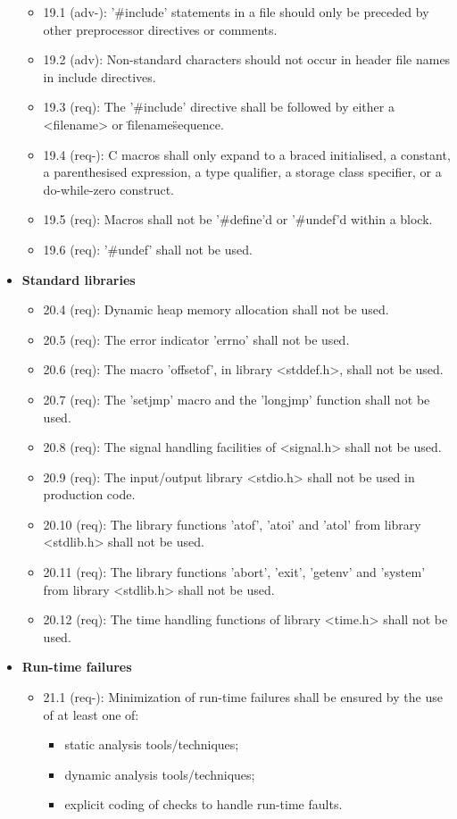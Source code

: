 \begin{itemize}
\begin{itemize}
\item 19.1 (adv-): '\#include' statements in a file should only be preceded by other preprocessor directives or comments.
\item 19.2 (adv): Non-standard characters should not occur in header file names in include directives.
\item 19.3 (req): The '\#include' directive shall be followed by either a <filename> or \"filename\" sequence.
\item 19.4 (req-): C macros shall only expand to a braced initialised, a constant, a parenthesised expression, a type qualifier, a storage class specifier, or a do-while-zero construct.
\item 19.5 (req): Macros shall not be '\#define'd or '\#undef'd within a block.
\item 19.6 (req): '\#undef' shall not be used.
\end{itemize}
\item \textbf{Standard libraries}
\begin{itemize}
\item 20.4 (req): Dynamic heap memory allocation shall not be used.
\item 20.5 (req): The error indicator 'errno' shall not be used.
\item 20.6 (req): The macro 'offsetof', in library <stddef.h>, shall not be used.
\item 20.7 (req): The 'setjmp' macro and the 'longjmp' function shall not be used.
\item 20.8 (req): The signal handling facilities of <signal.h> shall not be used.
\item 20.9 (req): The input/output library <stdio.h> shall not be used in production code.
\item 20.10 (req): The library functions 'atof', 'atoi' and 'atol' from library <stdlib.h> shall not be used.
\item 20.11 (req): The library functions 'abort', 'exit', 'getenv' and 'system' from library <stdlib.h> shall not be used.
\item 20.12 (req): The time handling functions of library <time.h> shall not be used.
\end{itemize}
\item \textbf{Run-time failures}
\begin{itemize}
\item 21.1 (req-): Minimization of run-time failures shall be ensured by the use of at least one of: 
\begin{itemize}
\item static analysis tools/techniques;
\item dynamic analysis tools/techniques;
\item explicit coding of checks to handle run-time faults.
\end{itemize}
\end{itemize}
\end{itemize}

